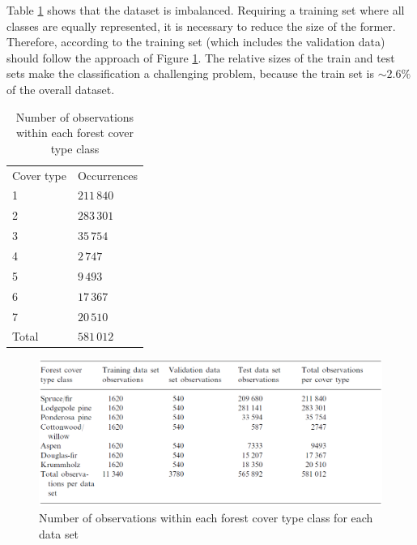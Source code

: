 Table \ref{tab:covertypes} shows that the dataset is imbalanced. Requiring a training set where all classes are equally represented, it is necessary to reduce the size of the former. Therefore, according to \cite{blackardDean} the training set (which includes the validation data) should follow the approach of Figure \ref{fig:covertypesdims}. The relative sizes of the train and test sets make the classification a challenging problem, because the train set is $\sim2.6\%$ of the overall dataset.
\begin{table}
	\centering
	\begin{tabular}{ll}
		Cover type & Occurrences \\
		1          & $211\,840$  \\
		2          & $283\,301$  \\
		3          & $35\,754$   \\
		4          & $2\,747$    \\
		5          & $9\,493$    \\
		6          & $17\,367$   \\
		7          & $20\,510$   \\
		Total      & $581\,012$     
	\end{tabular}
	\caption{Number of observations within each forest cover type class}
	\label{tab:covertypes}
\end{table}
\begin{figure}
	\centering
	\includegraphics[width=\textwidth]{./TeX_files/img/covertypetable.png}
	\caption{Number of observations within each forest cover type class for each data set}
	\label{fig:covertypesdims}
\end{figure}

